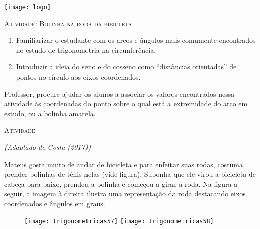 \documentclass[10 pt,usenames,dvipsnames, oneside]{article}
\begin{document}
\begin{center}
  \begin{minipage}[l]{3cm}
\texttt{[image: logo]}    
\end{minipage}\hfill
\begin{minipage}[r]{.8\textwidth}
 {\Large \scshape Atividade: Bolinha na roda da bibicleta}  
\end{minipage}
\end{center}
\vspace{.2cm}

\ifdefined\prof

\begin{goals}
\begin{enumerate}
\item Familiarizar o estudante com os arcos e ângulos mais comumente encontrados no estudo de trigonometria na circunferência.
\item Introduzir a ideia do seno e do cosseno como “distâncias orientadas”{} de pontos no círculo aos eixos coordenados.
\end{enumerate}

\tcblower

Professor, procure ajudar os alunos a associar os valores encontrados nessa atividade às coordenadas do ponto sobre o qual está a extremidade do arco em estudo, ou a bolinha amarela.
\end{goals}

\bigskip
\begin{center}
{\large \scshape Atividade}
\end{center}
\fi

\textit{(Adaptado de Costa (2017))}

Mateus gosta muito de andar de bicicleta e para enfeitar suas rodas, costuma prender bolinhas de tênis nelas (vide figura). Suponha que ele virou a bicicleta de cabeça para baixo, prendeu a bolinha e começou a girar a roda. Na figura a seguir, a imagem à direita ilustra uma representação da roda destacando eixos coordenados e ângulos em graus.

\begin{figure}[H]
\centering

\texttt{[image: trigonometricas57]}
\texttt{[image: trigonometricas58]}
\end{figure}
\end{document}
